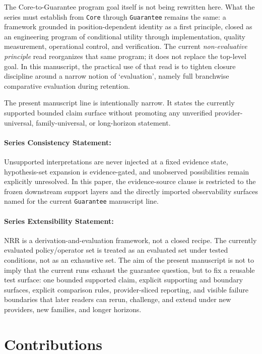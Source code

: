 \documentclass[11pt]{article}
\renewcommand{\_}{\textunderscore\hspace{0pt}}
\begin{document}
The Core-to-Guarantee program goal itself is not being rewritten here. What the
series must establish from \texttt{Core} through \texttt{Guarantee} remains the
same: a framework grounded in position-dependent identity as a first principle,
closed as an engineering program of conditional utility through
implementation, quality measurement, operational control, and verification. The
current \textit{non-evaluative principle} read reorganizes that same program; it
does not replace the top-level goal. In this manuscript, the practical use of
that read is to tighten closure discipline around a narrow notion of
`evaluation', namely full branchwise comparative evaluation during retention.

The present manuscript line is intentionally narrow. It states the currently supported
bounded claim surface without promoting any unverified provider-universal,
family-universal, or long-horizon statement.

\paragraph{Series Consistency Statement:}
Unsupported interpretations are never injected at a fixed evidence state,
hypothesis-set expansion is evidence-gated, and unobserved possibilities remain
explicitly unresolved. In this paper, the evidence-source clause is restricted to
the frozen downstream support layers and the directly imported observability
surfaces named for the current \texttt{Guarantee} manuscript line.

\paragraph{Series Extensibility Statement:}
NRR is a derivation-and-evaluation framework, not a closed recipe. The currently
evaluated policy/operator set is treated as an evaluated set under tested
conditions, not as an exhaustive set. The aim of the present manuscript is not
to imply that the current runs exhaust the guarantee question, but to fix a
reusable test surface: one bounded supported claim, explicit supporting and
boundary surfaces, explicit comparison rules, provider-sliced reporting, and
visible failure boundaries that later readers can rerun, challenge, and extend
under new providers, new families, and longer horizons.

\section{Contributions}
\end{document}
